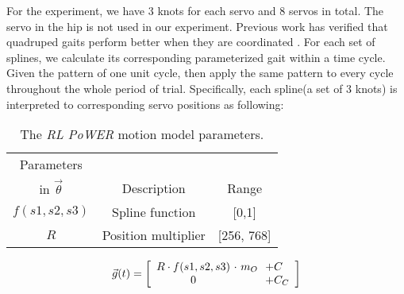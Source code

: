 For the experiment, we have 3 knots for each servo and 8
servos in total. The servo in the hip is not used in
our experiment. Previous work has verified that quadruped gaits
perform better when they are coordinated \cite{clune2009evolving-coordinated-quadruped} \cite{clune2011on-the-performance-of-indirect-encoding}
\cite{valsalam2008modular-neuroevolution-for-multilegged}. For each set of
splines, we calculate its corresponding parameterized gait within a
time cycle. Given the pattern of one unit cycle, then apply the same
pattern to every cycle throughout the whole period of
trial. Specifically, each spline(a set of 3 knots) is interpreted to corresponding servo positions as
following:

\begin{table}[b]
\begin{center}
\begin{tabular}{|c|c|c|}
\hline
Parameters        &                           &       \\
in $\vec{\theta}$ & Description               & Range \\
\hline
\hline
$f(s1,s2,s3)$        & Spline function           & [0,1] \\  %
\hline
$R$          & Position multiplier                & [256, 768] \\
\hline
\end{tabular}
\caption{The \emph{RL PoWER} motion model parameters.}
\label{tab:params}
\end{center}
\end{table}


\[
\vec{g}(t) =
\left[ {\begin{array}{c@{ }c@{ }c@{ }l@{ }l}
R \cdot f(s1, s2, s3) & \ \cdot \ m_O         & \             & \            & + C \\ %
0                              & \             & \             & \            & + C_C \\ %
\end{array} } \right]
\]



